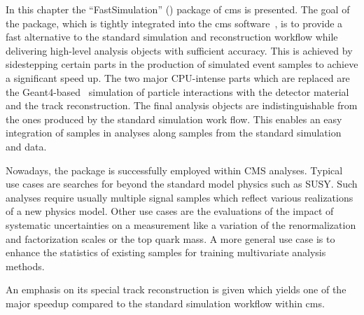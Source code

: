 In this chapter the ``FastSimulation'' (\FSIM[format=hyperbf]) package of \gls{cms} is presented. The goal of the \FSIM package, which is tightly integrated into the \gls{cms} software~\cite{Bayatian:922757}, is to provide a fast alternative to the standard simulation and reconstruction workflow while delivering high-level analysis objects with sufficient accuracy. This is achieved by sidestepping certain parts in the production of simulated event samples to achieve a significant speed up. The two major CPU-intense parts which are replaced are the Geant4-based~\cite{Agostinelli2003250} simulation of particle interactions with the detector material and the track reconstruction. The final analysis objects are indistinguishable from the ones produced by the standard simulation work flow. This enables an easy integration of \FSIM samples in analyses along samples from the standard simulation and data.

Nowadays, the \FSIM package is successfully employed within CMS analyses. Typical use cases are searches for beyond the standard model physics such as SUSY. Such analyses require usually multiple signal samples which reflect various realizations of a new physics model. Other use cases are the evaluations of the impact of systematic uncertainties on a measurement like a variation of the renormalization and factorization scales or the top quark mass. A more general use case is to enhance the statistics of existing samples for training multivariate analysis methods.


An emphasis on its special track reconstruction is given which yields one of the major speedup compared to the standard simulation workflow within \gls{cms}.


